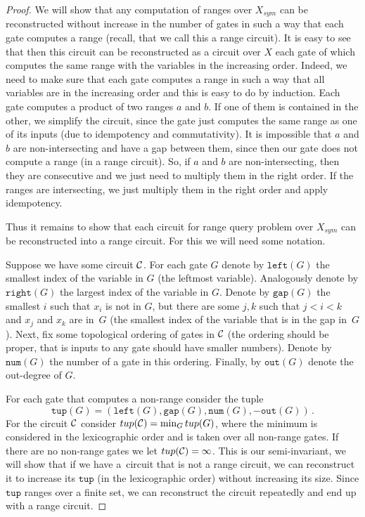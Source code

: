 \documentclass[11pt]{article}
\numberwithin{equation}{section}
\theoremstyle{definition}
\theoremstyle{plain}
\theoremstyle{plain}\newtheorem{observation}[theorem]{Observation}
\newcommand{\lef}{\texttt{left}}
\newcommand{\righ}{\texttt{right}}
\newcommand{\gap}{\texttt{gap}}
\newcommand{\num}{\texttt{num}}
\newcommand{\out}{\texttt{out}}
\newcommand{\tup}{\texttt{tup}}
\begin{document}
\begin{proof}[Proof]
    We will show that any computation of ranges over $X_{sym}$ can be reconstructed without increase in the number of gates in such a way that each gate computes a range (recall, that we call this a range circuit). It is easy to see that then this circuit can be reconstructed as a circuit over $X$ each gate of which computes the same range with the variables in the increasing order. Indeed, we need to make sure that each gate computes a range in such a way that all variables are in the increasing order and this is easy to do by induction. Each gate computes a product of two ranges $a$ and $b$. If one of them is contained in the other, we simplify the circuit, since the gate just computes the same range as one of its inputs (due to idempotency and commutativity). It is impossible that $a$ and $b$ are non-intersecting and have a gap between them, since then our gate does not compute a range (in a range circuit). So, if $a$ and  $b$ are non-intersecting, then they are consecutive and we just need to multiply them in the right order. If the ranges are intersecting, we just multiply them in the right order and apply idempotency.

    Thus it remains to show that each circuit for range query problem over $X_{sym}$ can be reconstructed into a range circuit. For this we will need some notation.

    Suppose we have some circuit ${\cal C}$. For each gate $G$ denote by $\lef(G)$ the smallest index of the variable in $G$ (the leftmost variable). Analogously denote by $\righ(G)$ the largest index of the variable in $G$. Denote by $\gap(G)$ the smallest $i$ such that $x_i$ is not in $G$, but there are some $j,k$ such that $j<i<k$ and $x_j$ and $x_k$ are in~$G$ (the smallest index of the variable that is in the gap in~$G$).
    Next, fix some topological ordering of gates in ${\cal C}$ (the ordering should be proper, that is inputs to any gate should have smaller numbers). Denote by $\num(G)$ the number of a gate in this ordering. Finally, by $\out(G)$ denote the out-degree of $G$.

    For each gate that computes a non-range consider the tuple
    $$
    \tup(G)=(\lef(G),\gap(G),\num(G),-\out(G))\,.
    $$ For the circuit ${\cal C}$ consider $\tup({\cal C}) = \min_G \tup(G)$, where the minimum is considered in the lexicographic order and is taken over all non-range gates. If there are no non-range gates we let $\tup({\cal C})=\infty$. This is our semi-invariant, we will show that if we have a~circuit that is not a range circuit, we can reconstruct it to increase  its $\tup$ (in the lexicographic order) without increasing its size. Since $\tup$ ranges over a finite set, we can reconstruct the circuit repeatedly and end up with a range circuit.


\end{proof}
\end{document}
